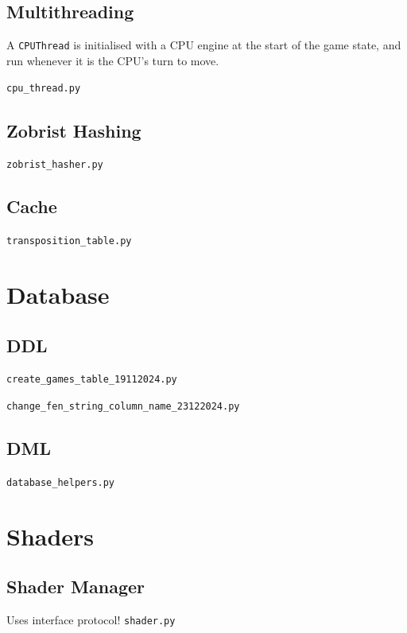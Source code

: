 \documentclass[../main/main.tex]{subfiles}
\begin{document}
\subsection{Multithreading}
A \lstinline{CPUThread} is initialised with a CPU engine at the start of the game state, and run whenever it is the CPU's turn to move.

\noindent\verb|cpu_thread.py|
\label{sec:cpu-thread}


\subsection{Zobrist Hashing}
\label{sec:zobrist-hashing}
\noindent\verb|zobrist_hasher.py|


\subsection{Cache}
\noindent\verb|transposition_table.py|


\section{Database}
\subsection{DDL}
\noindent\verb|create_games_table_19112024.py|


\bigskip
\noindent\verb|change_fen_string_column_name_23122024.py|


\subsection{DML}
\noindent\verb|database_helpers.py|


\section{Shaders}
\subsection{Shader Manager}
Uses interface protocol!
\noindent\verb|shader.py|

\end{document}
